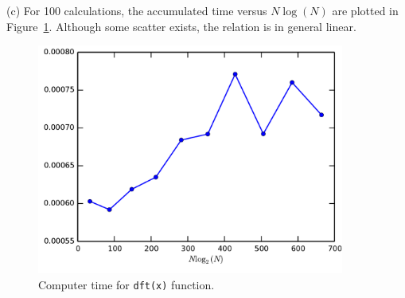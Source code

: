 \documentclass[11pt,letterpaper]{article}
\begin{document}
(c) For 100 calculations, the accumulated time versus $N\log(N)$ are plotted in Figure~\ref{fig2}. Although some scatter exists, the relation is in general linear.
\begin{figure}[bth]
\centering
\includegraphics[width=0.9\textwidth]{fig2.pdf}
\caption{Computer time for {\tt dft(x)} function.}
\label{fig2}
\end{figure}
\end{document}

